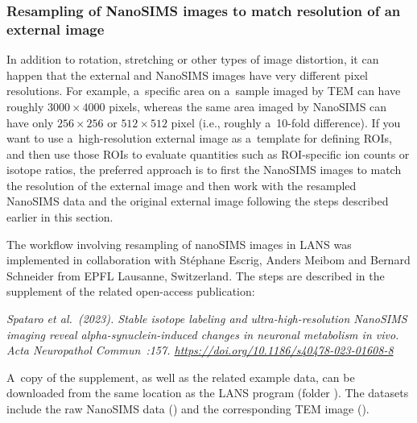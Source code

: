 

\subsubsection{Resampling of NanoSIMS images to match resolution of an external image}
\setcounter{step}{0}

\goldbox{}
In addition to rotation, stretching or other types of image distortion, it can happen that the external and NanoSIMS images have very different pixel resolutions. For example, a~specific area on a~sample imaged by TEM can have roughly $3000\times 4000$ pixels, whereas the same area imaged by NanoSIMS can have only $256\times 256$ or $512\times 512$ pixel (i.e., roughly a~10-fold difference). If you want to use a~high-resolution external image as a~template for defining ROIs, and then use those ROIs to evaluate quantities such as ROI-specific ion counts or isotope ratios, the preferred approach is to first  the NanoSIMS images to match the resolution of the external image and then work with the resampled NanoSIMS data and the original external image following the steps described earlier in this section.
\tcbe

The workflow involving resampling of nanoSIMS images in LANS was implemented in collaboration with St\'ephane Escrig, Anders Meibom and Bernard Schneider from EPFL Lausanne, Switzerland. The steps are described in the supplement of the related open-access publication:
\begin{center}
\begin{minipage}{0.93\textwidth}
\textsl{\small Spataro et al.~(2023). Stable isotope labeling and ultra-high-resolution NanoSIMS imaging reveal alpha-synuclein-induced changes in neuronal metabolism in vivo. \emph{Acta Neuro\-pathol Commun}~:157. \url{https://doi.org/10.1186/s40478-023-01608-8}}
\end{minipage}
\end{center}

A~copy of the supplement, as well as the related example data, can be downloaded from the same location as the LANS program (folder ). The datasets include the raw NanoSIMS data () and the corresponding TEM image (). 